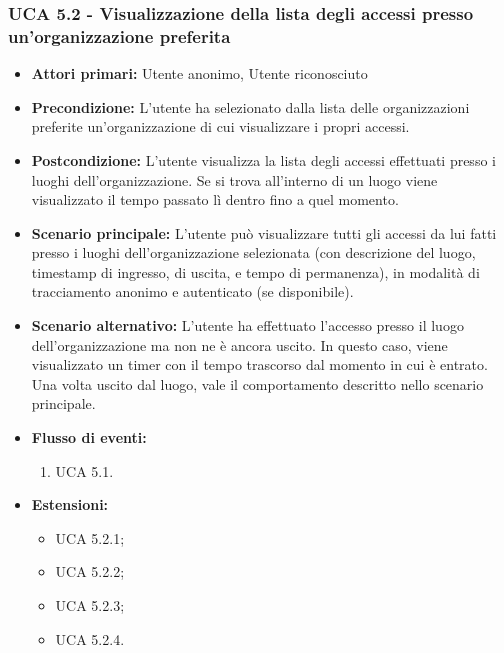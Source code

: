 \subsubsection{UCA 5.2 - Visualizzazione della lista degli accessi presso un'organizzazione preferita}
\begin{itemize}
    \item \textbf{Attori primari:} Utente anonimo, Utente riconosciuto
    \item \textbf{Precondizione:} L'utente ha selezionato dalla lista delle organizzazioni preferite un'organizzazione di cui visualizzare i propri accessi.
    \item \textbf{Postcondizione:} L'utente visualizza la lista degli accessi effettuati presso i luoghi dell'organizzazione. Se si trova all'interno di un luogo viene visualizzato il tempo passato lì dentro fino a quel momento.
    \item \textbf{Scenario principale:} L'utente può visualizzare tutti gli accessi da lui fatti presso i luoghi dell'organizzazione selezionata (con descrizione del luogo, timestamp di ingresso, di uscita, e tempo di permanenza), in modalità di tracciamento anonimo e autenticato (se disponibile).
    \item \textbf{Scenario alternativo:} L'utente ha effettuato l'accesso presso il luogo dell'organizzazione ma non ne è ancora uscito. In questo caso, viene visualizzato un timer con il tempo trascorso dal momento in cui è entrato.
    Una volta uscito dal luogo, vale il comportamento descritto nello scenario principale.
    \item \textbf{Flusso di eventi:}
    \begin{enumerate}
        \item UCA 5.1.
    \end{enumerate}
    \item \textbf{Estensioni:}
    \begin{itemize}
        \item UCA 5.2.1;
        \item UCA 5.2.2;
        \item UCA 5.2.3;
        \item UCA 5.2.4.
    \end{itemize}
\end{itemize}


